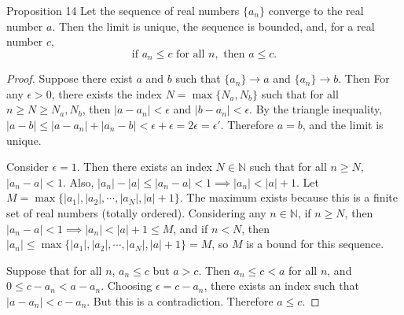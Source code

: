\begin{namedthm*}{Proposition 14}
Let the sequence of real numbers $\{a_n\}$ converge to the real number $a$. 
Then the limit is unique, the sequence is bounded, and, for a real number $c$, 
\[
\text{if } a_n \le c \text{ for all } n, \text{ then } a\le c.	
\]	
\end{namedthm*}
\begin{proof}
	Suppose there exist $a$ and $b$ such that $\{a_n\}\to a$ and $\{a_n\}\to b$.
	Then For any $\epsilon >0$, there exists the index $N = \max \{N_a,N_b\}$ such that for all $n \ge N \ge N_a,N_b$, then $|a-a_n| < \epsilon$ and $|b-a_n| < \epsilon$.
	By the triangle inequality, $|a-b| \le |a-a_n| + |a_n-b| < \epsilon + \epsilon = 2 \epsilon = \epsilon ' $.
	Therefore $a=b$, and the limit is unique. \par
	Consider $\epsilon =1$. Then there exists an index $N \in \mathbb{N}$ such that for all $n \ge N$, $|a_n-a| < 1$.
	Also, $|a_n|-|a| \le |a_n-a| <1\implies |a_n| < |a| +1$.
	Let $M = \max \{|a_1|, |a_2|, \cdots, |a_N|, |a|+1 \}$. The maximum exists because this is a finite set of real numbers (totally ordered).
	Considering any $n \in \mathbb{N}$, if $n \ge N$, then $|a_n-a| <1\implies |a_n| < |a| +1 \le M$, and if $n<N$, then $|a_n| \le \max \{|a_1|, |a_2|, \cdots, |a_N|, |a|+1 \} =M$, so $M$ is a bound for this sequence.
	\par
	Suppose that for all $n$, $a_n \le c$ but $a>c$. 
	Then $a_n \le c < a$ for all $n$, and $0 \le c-a_n <a-a_n$.
	Choosing $\epsilon = c-a_n$, there exists an index such that $|a-a_n| < c-a_n$. But this is a contradiction. 
	Therefore $a \le c$.
\end{proof}

